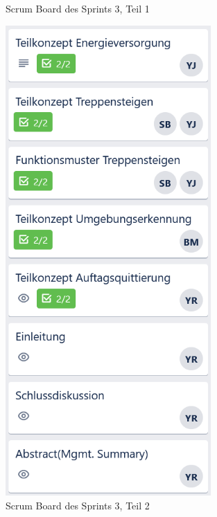 \begin{figure}[H]
\begin{minipage}[t]{0.45\linewidth}
  \caption{Scrum Board des Sprints 3, Teil 1}
  \label{Scrum Board 3.1}
  \end{minipage} 
  \hfill
  \begin{minipage}[t]{0.45\linewidth}
  \includegraphics[width=0.7\textwidth]{img/Trello/Trello-Bord_3_Nr2.PNG}
  \caption{Scrum Board des Sprints 3, Teil 2}
  \label{Scrum Board 3.2}
  \end{minipage}
\end{figure}
   